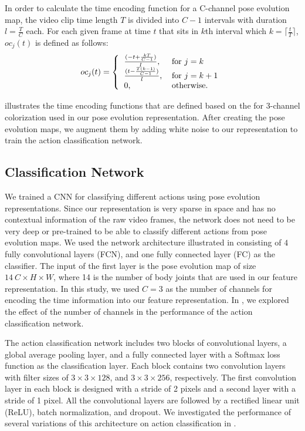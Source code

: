 In order to calculate the time encoding function for a C-channel pose evolution map, the video clip time length $T$ is divided into $C-1$ intervals with duration $l=\frac{T}{C}$ each. For each given frame at time $t$ that sits in $k$th interval which $k=\lceil \frac{t}{T} \rceil$, $oc_j(t)$ is defined as follows:
\begin{align} \label{eqn:colorFun}
     oc_j(t) = \left \{
      \begin{tabular} {ll}
          $\frac{(-t + \frac{kT}{C-1})}{l} $,  & for $j=k$\\
          $\frac{(t - \frac{T(k-1)}{C-1})}{l}$, & for $j=k+1$ \\
          $0$, & otherwise.
      \end{tabular}
     \right.
\end{align}

\ColorCode
{} illustrates the time encoding functions that are defined based on the  for 3-channel colorization used in our pose evolution representation. After creating the pose evolution maps, we augment them by adding white noise to our representation to train the action classification network. 

\subsection{Classification Network}
\label{sec:network}
We trained a CNN for classifying different actions using pose evolution representations. Since our representation is very sparse in space and has no contextual information of the raw video frames, the network does not need to be very deep or pre-trained to be able to classify different actions from pose evolution maps. We used the network architecture illustrated in  consisting of $4$ fully convolutional layers (FCN), and one fully connected layer (FC) as the classifier. The input of the first layer is the pose evolution map of size $14~C \times H \times W$, where 14 is the number of body joints that are used in our feature representation. In this study, we used $C=3$ as the number of channels for encoding the time information into our feature representation. In , we explored the effect of the number of channels in the performance of the action classification network.

The action classification network includes two blocks of convolutional layers, a global average pooling layer, and a fully connected layer with a Softmax loss function as the classification layer. Each block contains two convolution layers with filter sizes of $3 \times 3 \times 128$, and $3 \times 3 \times 256$, respectively. The first convolution layer in each block is designed with a stride of 2 pixels and a second layer with a stride of 1 pixel. All the convolutional layers are followed by a rectified linear unit (ReLU), batch normalization, and dropout. We investigated the performance of several variations of this architecture on action classification in . 

\ActionNet